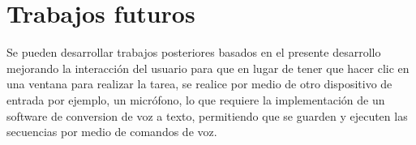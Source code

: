 \section{Trabajos futuros}
Se pueden desarrollar trabajos posteriores basados en el presente desarrollo
 mejorando la interacci\'on del usuario para que en lugar de tener que hacer 
 clic en una ventana para realizar la tarea, se realice por medio de otro 
 dispositivo de entrada por ejemplo, un micr\'ofono, lo que requiere la 
 implementaci\'on de un software de conversion de voz a texto, permitiendo que 
 se guarden y ejecuten las secuencias por medio de comandos de voz. 
